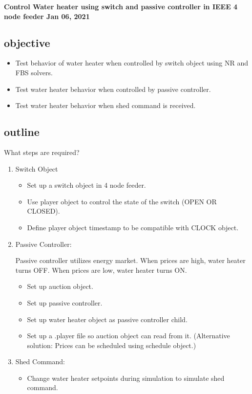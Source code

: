 \textbf{Control Water heater using switch and passive controller in IEEE 4 node feeder Jan 06, 2021}
\subsection{objective} 
    \begin{itemize}
        \item Test behavior of water heater when controlled by switch object using NR and FBS solvers.
        \item Test water heater behavior when controlled by passive controller.
        \item Test water heater behavior when shed command is received.
    \end{itemize}
\subsection{outline}
    
    What steps are required?
    \begin{enumerate}
        \item Switch Object
        \begin{itemize}
            \item Set up a switch object in 4 node feeder.
            \item Use player object to control the state of the switch (OPEN OR CLOSED).
            \item Define player object timestamp to be compatible with CLOCK object. 
        \end{itemize}
        \item Passive Controller:\par
        Passive controller utilizes energy market. When prices are high, water heater turns OFF. When prices are low, water heater turns ON.
        \begin{itemize}
            \item Set up auction object.
            \item Set up passive controller.
            \item Set up water heater object as passive controller child.
            \item Set up a .player file so auction object can read from it. (Alternative solution: Prices can be scheduled using schedule object.)
        \end{itemize}
        \item Shed Command:
        \begin{itemize}
            \item Change water heater setpoints during simulation to simulate shed command.
        \end{itemize}
    \end{enumerate}
